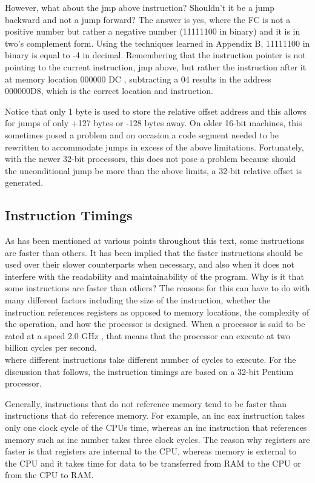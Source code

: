 \documentclass[10pt]{book}
\begin{document}
However, what about the jmp above instruction? Shouldn't it be a jump backward and not a jump forward? The answer is yes, where the FC is not a positive number but rather a negative number (11111100 in binary) and it is in two's complement form. Using the techniques learned in Appendix B, 11111100 in binary is equal to -4 in decimal. Remembering that the instruction pointer is not pointing to the current instruction, jmp above, but rather the instruction after it at memory location 000000 DC , subtracting a 04 results in the address 000000D8, which is the correct location and instruction.

Notice that only 1 byte is used to store the relative offset address and this allows for jumps of only +127 bytes or -128 bytes away. On older 16-bit machines, this sometimes posed a problem and on occasion a code segment needed to be rewritten to accommodate jumps in excess of the above limitations. Fortunately, with the newer 32-bit processors, this does not pose a problem because should the unconditional jump be more than the above limits, a 32-bit relative offset is generated.

\subsection{Instruction Timings}
As has been mentioned at various points throughout this text, some instructions are faster than others. It has been implied that the faster instructions should be used over their slower counterparts when necessary, and also when it does not interfere with the readability and maintainability of the program. Why is it that some instructions are faster than others? The reasons for this can have to do with many different factors including the size of the instruction, whether the instruction references registers as opposed to memory locations, the complexity of the operation, and how the processor is designed. When a processor is said to be rated at a speed 2.0 GHz , that means that the processor can execute at two billion cycles per second,\\
where different instructions take different number of cycles to execute. For the discussion that follows, the instruction timings are based on a 32-bit Pentium processor.


Generally, instructions that do not reference memory tend to be faster than instructions that do reference memory. For example, an inc eax instruction takes only one clock cycle of the CPUs time, whereas an inc instruction that references memory such as inc number takes three clock cycles. The reason why registers are faster is that registers are internal to the CPU, whereas memory is external to the CPU and it takes time for data to be transferred from RAM to the CPU or from the CPU to RAM.
\end{document}
